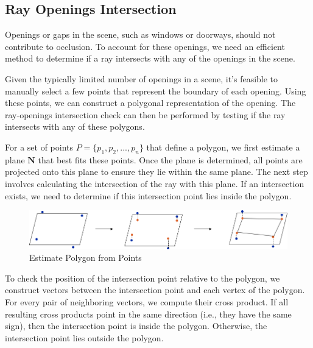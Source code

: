 \documentclass[11pt, a4paper,oneside,chapterprefix=false]{scrbook}
\begin{document}
\subsection{Ray Openings Intersection}

Openings or gaps in the scene, such as windows or doorways, should not contribute to occlusion. To account for these openings, we need an efficient method to determine if a ray intersects with any of the openings in the scene.

\vspace{10pt}

Given the typically limited number of openings in a scene, it's feasible to manually select a few points that represent the boundary of each opening. Using these points, we can construct a polygonal representation of the opening. The ray-openings intersection check can then be performed by testing if the ray intersects with any of these polygons.

\vspace{10pt}

For a set of points \( P = \{p_1, p_2, ..., p_n\} \) that define a polygon, we first estimate a plane \( \mathbf{N} \) that best fits these points. Once the plane is determined, all points are projected onto this plane to ensure they lie within the same plane. The next step involves calculating the intersection of the ray with this plane. If an intersection exists, we need to determine if this intersection point lies inside the polygon.

\begin{minipage}{\textwidth}
	\begin{figure}[H]
		\centering
		\includegraphics*[width=1.0\textwidth]{figures/detect openings.png}
		\caption{Estimate Polygon from Points}
		\label{fig:estimate polygon from points}
	\end{figure}
\end{minipage}

To check the position of the intersection point relative to the polygon, we construct vectors between the intersection point and each vertex of the polygon. For every pair of neighboring vectors, we compute their cross product. If all resulting cross products point in the same direction (i.e., they have the same sign), then the intersection point is inside the polygon. Otherwise, the intersection point lies outside the polygon.
\end{document}
